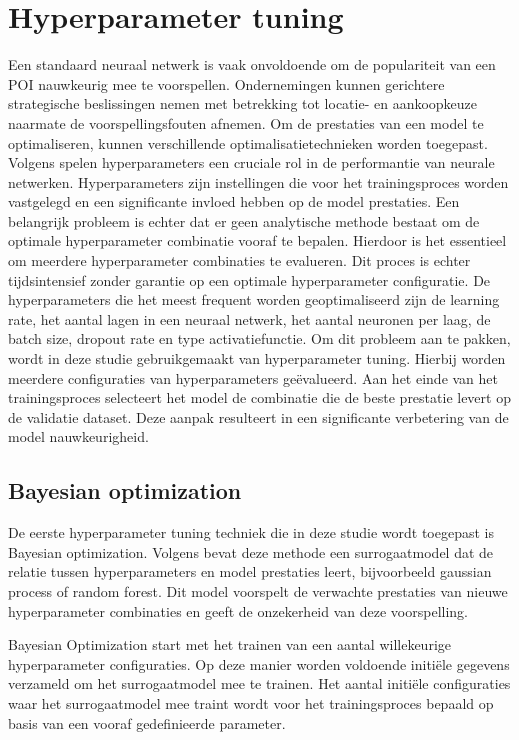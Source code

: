 \section{Hyperparameter tuning}
Een standaard neuraal netwerk is vaak onvoldoende om de populariteit van een POI nauwkeurig mee te voorspellen. Ondernemingen kunnen gerichtere strategische beslissingen nemen met betrekking tot locatie- en aankoopkeuze naarmate de voorspellingsfouten afnemen. Om de prestaties van een model te optimaliseren, kunnen verschillende optimalisatietechnieken worden toegepast.
Volgens \textcite{Yang2020} spelen hyperparameters een cruciale rol in de performantie van neurale netwerken. Hyperparameters zijn instellingen die voor het trainingsproces worden vastgelegd en een significante invloed hebben op de model prestaties. Een belangrijk probleem is echter dat er geen analytische methode bestaat om de optimale hyperparameter combinatie vooraf te bepalen. Hierdoor is het essentieel om meerdere hyperparameter combinaties te evalueren. Dit proces is echter tijdsintensief zonder garantie op een optimale hyperparameter configuratie. De hyperparameters die het meest frequent worden geoptimaliseerd zijn de learning rate, het aantal lagen in een neuraal netwerk, het aantal neuronen per laag, de batch size, dropout rate en type activatiefunctie.
Om dit probleem aan te pakken, wordt in deze studie gebruikgemaakt van hyperparameter tuning. Hierbij worden meerdere configuraties van hyperparameters geëvalueerd. Aan het einde van het trainingsproces selecteert het model de combinatie die de beste prestatie levert op de validatie dataset. Deze aanpak resulteert in een significante verbetering van de model nauwkeurigheid.

\subsection{Bayesian optimization}
De eerste hyperparameter tuning techniek die in deze studie wordt toegepast is Bayesian optimization. Volgens \textcite{Kotthoff2021} bevat deze methode een surrogaatmodel dat de relatie tussen hyperparameters en model prestaties leert, bijvoorbeeld gaussian process of random forest. Dit model voorspelt de verwachte prestaties van nieuwe hyperparameter combinaties en geeft de onzekerheid van deze voorspelling.

Bayesian Optimization start met het trainen van een aantal willekeurige hyperparameter configuraties. Op deze manier worden voldoende initiële gegevens verzameld om het surrogaatmodel mee te trainen. Het aantal initiële configuraties waar het surrogaatmodel mee traint wordt voor het trainingsproces bepaald op basis van een vooraf gedefinieerde parameter.

